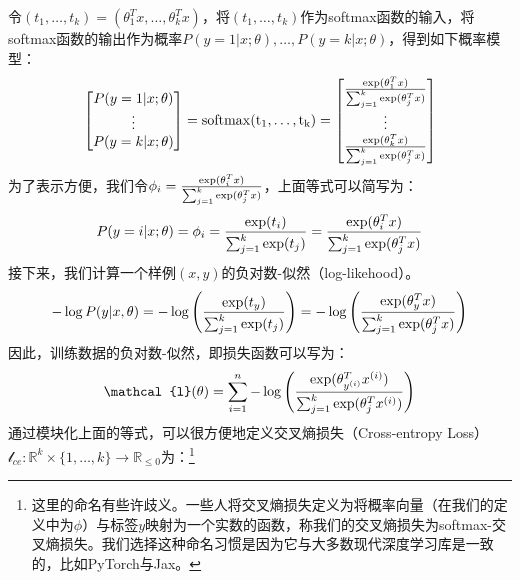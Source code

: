 令$(t_1,\ldots,t_k)=(\theta_1^Tx,\ldots,\theta_k^Tx)$，将$(t_1,\ldots,t_k)$作为softmax函数的输入，将softmax函数的输出作为概率$P(y=1 | x;\theta),\ldots,P(y=k | x;\theta)$，得到如下概率模型：
\begin{equation}
  \begin{bmatrix}
    P(y=1 | x;\theta) \\
    \vdots            \\
    P(y=k | x;\theta) \\
  \end{bmatrix}
  =
  \rm{softmax}(t_1,\ldots,t_k)
  =
  \begin{bmatrix}
    \frac{{\rm{exp}} (\theta_1^T x)}{\sum^k_{j=1}{\rm{exp}} (\theta_j^T x)} \\
    \vdots                                                                  \\
    \frac{{\rm{exp}} (\theta_k^T x)}{\sum^k_{j=1}{\rm{exp}} (\theta_j^T x)} \\
  \end{bmatrix}
\end{equation}
为了表示方便，我们令$\phi_i=\frac{{\rm{exp}} (\theta_i^T x)}{\sum^k_{j=1}{\rm{exp}} (\theta_j^T x)}$，上面等式可以简写为：
\begin{equation}
  P(y=i|x;\theta) = \phi_i= \frac{{\rm{exp}} (t_i)}{\sum^k_{j=1}{\rm{exp}} (t_j)} = \frac{{\rm{exp}} (\theta_i^T x)}{\sum^k_{j=1}{\rm{exp}} (\theta_j^T x)}
\end{equation}
接下来，我们计算一个样例$(x,y)$的负对数-似然（log-likehood）。
\begin{equation}
  -\log P(y|x,\theta)=-\log \left( \frac{{\rm{exp}} (t_y)}{\sum^k_{j=1}{\rm{exp}} (t_j)} \right) = -\log \left( \frac{{\rm{exp}} (\theta_y^T x)}{\sum^k_{j=1}{\rm{exp}} (\theta_j^T x)} \right)
\end{equation}
因此，训练数据的负对数-似然，即损失函数可以写为：
\begin{equation} \label{multi-class-loss}
  \mathcal{l}(\theta) = \sum^n_{i=1} - \log \left( \frac{{\rm{exp}} (\theta_{y^{(i)}}^T x^{(i)})}{\sum^k_{j=1}{\rm{exp}} (\theta_j^T x^{(i)})} \right)
\end{equation}
通过模块化上面的等式，可以很方便地定义交叉熵损失（Cross-entropy Loss）$\mathcal{l}_{ce}:\mathbb{R}^k \times \{1,\ldots,k\} \rightarrow \mathbb{R}_{\leq 0}$为：\footnote{这里的命名有些许歧义。一些人将交叉熵损失定义为将概率向量（在我们的定义中为$\phi$）与标签$y$映射为一个实数的函数，称我们的交叉熵损失为softmax-交叉熵损失。我们选择这种命名习惯是因为它与大多数现代深度学习库是一致的，比如PyTorch与Jax。}
